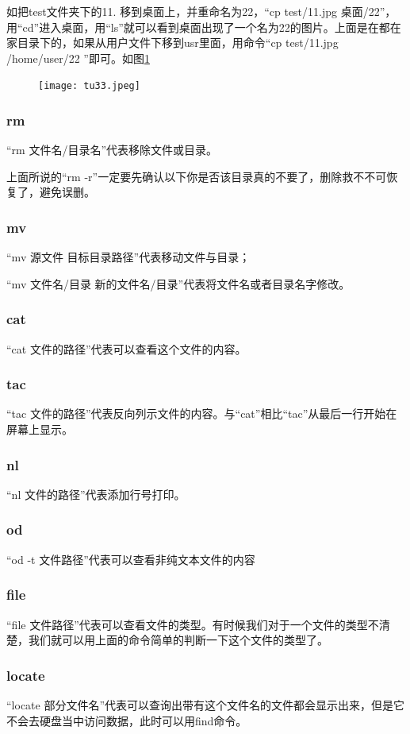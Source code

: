 \documentclass[12pt]{article}
\begin{document}
如把test文件夹下的11. 移到桌面上，并重命名为22，“cp test/11.jpg 桌面/22”，用“cd”进入桌面，用“ls”就可以看到桌面出现了一个名为22的图片。上面是在都在家目录下的，如果从用户文件下移到usr里面，用命令“cp test/11.jpg /home/user/22 ”即可。如图\ref{tu33}
\begin{figure}[!htb] %
\centering
\texttt{[image: tu33.jpeg]}
\caption{}
\label{tu33}
\end{figure} 

\subsubsection{rm}
“rm 文件名/目录名”代表移除文件或目录。

{\color{blue}上面所说的“rm -r”一定要先确认以下你是否该目录真的不要了，删除救不不可恢复了，避免误删}。
\subsubsection{mv}
“mv 源文件 目标目录路径”代表移动文件与目录；

“mv 文件名/目录 新的文件名/目录”代表将文件名或者目录名字修改。
\subsubsection{cat}
“cat 文件的路径”代表可以查看这个文件的内容。
\subsubsection{tac}
“tac 文件的路径”代表反向列示文件的内容。与“cat”相比“tac”从最后一行开始在屏幕上显示。
\subsubsection{nl}
“nl 文件的路径”代表添加行号打印。
\subsubsection{od} 
“od -t 文件路径”代表可以查看非纯文本文件的内容
\subsubsection{file}
“file 文件路径”代表可以查看文件的类型。有时候我们对于一个文件的类型不清楚，我们就可以用上面的命令简单的判断一下这个文件的类型了。
\subsubsection{locate}
“locate 部分文件名”代表可以查询出带有这个文件名的文件都会显示出来，但是它不会去硬盘当中访问数据，此时可以用find命令。
\end{document}
